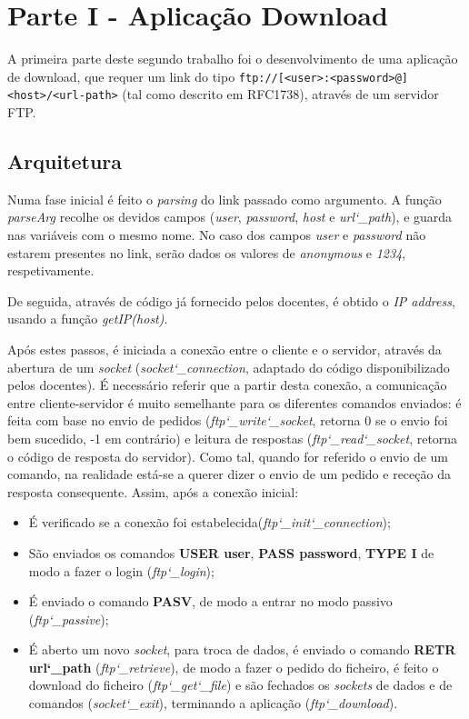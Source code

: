 \section*{Parte I - Aplicação Download}
A primeira parte deste segundo trabalho foi o desenvolvimento de uma aplicação de download, que requer
um link do tipo \verb+ftp://[<user>:<password>@]<host>/<url-path>+ (tal como descrito em RFC1738), através de um servidor FTP.

\subsection*{Arquitetura}
Numa fase inicial é feito o \textit{parsing} do link passado como argumento.
A função \textit{parseArg} recolhe os devidos campos (\textit{user}, \textit{password}, \textit{host} e \textit{url\char`_path}), e guarda nas variáveis com o mesmo nome.
No caso dos campos \textit{user} e \textit{password} não estarem presentes no link, serão dados os valores de \textit{anonymous} e \textit{1234}, respetivamente.

De seguida, através de código já fornecido pelos docentes, é obtido o \textit{IP address}, usando a função \textit{getIP(host)}.

Após estes passos, é iniciada a conexão entre o cliente e o servidor, através da abertura de um \textit{socket} (\textit{socket\char`_connection}, adaptado do código disponibilizado pelos docentes).
É necessário referir que a partir desta conexão, a comunicação entre cliente-servidor é muito semelhante para os diferentes comandos enviados: é feita com base no envio de pedidos (\textit{ftp\char`_write\char`_socket}, retorna 0 se o envio foi bem sucedido, -1 em contrário) e leitura de respostas (\textit{ftp\char`_read\char`_socket}, retorna o código de resposta do servidor). Como tal, quando for referido o envio de um comando, na realidade está-se a querer dizer o envio de um pedido e receção da resposta consequente.
Assim, após a conexão inicial:
\begin{itemize}
\item É verificado se a conexão foi estabelecida(\textit{ftp\char`_init\char`_connection});
\item São enviados os comandos \textbf{USER user}, \textbf{PASS password}, \textbf{TYPE I} de modo a fazer o login (\textit{ftp\char`_login});
\item É enviado o comando \textbf{PASV}, de modo a entrar no modo passivo (\textit{ftp\char`_passive});
\item É aberto um novo \textit{socket}, para troca de dados, é enviado o comando \textbf{RETR url\char`_path} (\textit{ftp\char`_retrieve}), de modo a fazer o pedido do ficheiro, é feito o download do ficheiro (\textit{ftp\char`_get\char`_file}) e são fechados os \textit{sockets} de dados e de comandos (\textit{socket\char`_exit}), terminando a aplicação (\textit{ftp\char`_download}).
\end{itemize}
